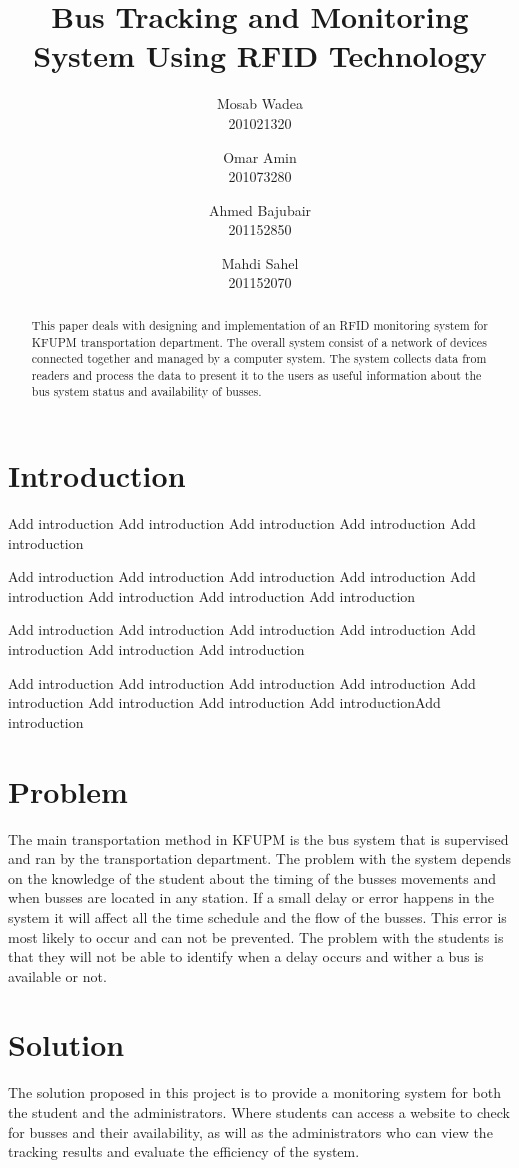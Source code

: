 \documentclass[a4paper,twoside]{IEEEtran}
\title{Bus Tracking and Monitoring System Using RFID Technology}
\author{
        Mosab Wadea\\
        201021320
\and
        Omar Amin\\
        201073280
\and
        Ahmed Bajubair\\
        201152850
\and
        Mahdi Sahel\\
        201152070
}
\begin{document}
\maketitle


\begin{abstract}
This paper deals with designing and implementation of an RFID monitoring system for KFUPM transportation department. The overall system consist of a network of devices connected together and managed by a computer system. The system collects data from readers and process the data to present it to the users as useful information about the bus system status and availability of busses.
\end{abstract}


\section{Introduction}
Add introduction
Add introduction
Add introduction
Add introduction
Add introduction


Add introduction
Add introduction
Add introduction
Add introduction
Add introduction
Add introduction
Add introduction
Add introduction



Add introduction
Add introduction
Add introduction
Add introduction
Add introduction
Add introduction
Add introduction


Add introduction
Add introduction
Add introduction
Add introduction
Add introduction
Add introduction
Add introduction
Add introductionAdd introduction
\section{Problem}
The main transportation method in KFUPM is the bus system that is supervised and ran by the transportation department. The problem with the system depends on the knowledge of the student about the timing of the busses movements and when busses are located in any station. If a small delay or error happens in the system it will affect all the time schedule and the flow of the busses. This error is most likely to occur and can not be prevented. The problem with the students is that they will not be able to identify when a delay occurs and wither a bus is available or not.

\section{Solution}
The solution proposed in this project is to provide a monitoring system for both the student and the administrators. Where students can access a website to check for busses and their availability, as will as the administrators who can view the tracking results and evaluate the efficiency of the system.
\end{document}
